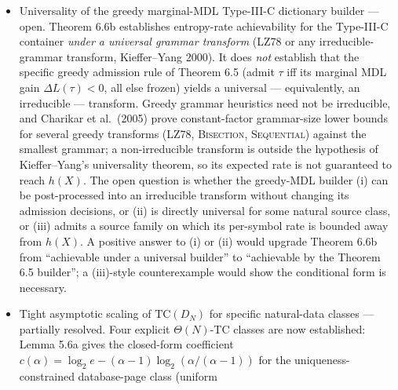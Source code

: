 \documentclass[
]{article}
\begin{document}
\begin{itemize}
  We retract any rigorous claim of asymptotic-strong-form closure of
  Conjecture 6.8d via escape-savings accounting. The right statement
  remains the conservative ``some $\varepsilon_{\mathrm{bit}} > 0$''
  weak form, with the K-optimisation obstacle a documented research
  direction. Resolving it requires either: (a) demonstrating that
  the Berman-Karpinski reduction can be modified to preserve the
  symbol-count gap at the $K = \sqrt{N}$ bit-cost-optimal regime;
  (b) using a different source-of-hardness problem that admits
  $K$-uniform gap preservation; or (c) proving an exponential-type
  lower bound on $L_{\mathrm{sym}}(K^*)$ for NO instances under
  Berman-Karpinski-hard inputs. All three are open research-level
  directions.
\item
  Universality of the greedy marginal-MDL Type-III-C dictionary builder
  --- open. Theorem 6.6b establishes entropy-rate achievability for the
  Type-III-C container \emph{under a universal grammar transform} (LZ78
  or any irreducible-grammar transform, Kieffer--Yang 2000). It does
  \emph{not} establish that the specific greedy admission rule of
  Theorem 6.5 (admit $\tau$ iff its marginal MDL gain $\Delta L(\tau) <
  0$, all else frozen) yields a universal --- equivalently, an
  irreducible --- transform. Greedy grammar heuristics need not be
  irreducible, and Charikar et al.\ (2005) prove constant-factor
  grammar-size lower bounds for several greedy transforms (LZ78,
  \textsc{Bisection}, \textsc{Sequential}) against the smallest grammar;
  a non-irreducible transform is outside the hypothesis of
  Kieffer--Yang's universality theorem, so its expected rate is not
  guaranteed to reach $h(X)$. The open question is whether the
  greedy-MDL builder (i) can be post-processed into an irreducible
  transform without changing its admission decisions, or (ii) is
  directly universal for some natural source class, or (iii) admits a
  source family on which its per-symbol rate is bounded away from
  $h(X)$. A positive answer to (i) or (ii) would upgrade Theorem 6.6b
  from ``achievable under a universal builder'' to ``achievable by the
  Theorem 6.5 builder''; a (iii)-style counterexample would show the
  conditional form is necessary.
\item
  Tight asymptotic scaling of $\mathrm{TC}(D_N)$ for specific
  natural-data classes --- partially resolved. Four explicit
  $\Theta(N)$-TC classes are now established:
  Lemma 5.6a gives the closed-form coefficient
  $c(\alpha) = \log_2 e - (\alpha-1)\log_2(\alpha/(\alpha-1))$ for
  the uniqueness-constrained database-page class (uniform

\end{itemize}
\end{document}
